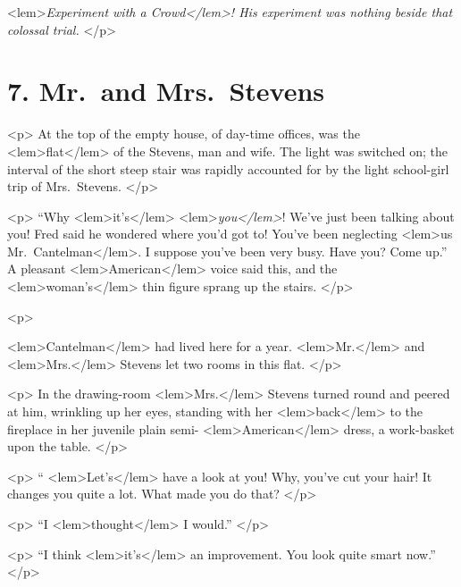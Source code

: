 {{<lem>\emph{Experiment with a Crowd</lem>! His experiment was nothing beside that colossal trial.}
					{} 
				</p> 

\newpage %

	\section*{7. Mr.\ and Mrs.\ Stevens} 

				<p>
				At the top of the empty house, of day-time offices, was the 
<lem>flat</lem>
					{} 
				of the Stevens, man 
				and wife. The light was switched on; the interval of the short steep stair was rapidly 
				accounted for by the light school-girl trip of Mrs.\ Stevens. 
 				</p> 

				<p>
				“Why 
<lem>it's</lem>{} 
<lem>\emph{you</lem>}{}! 
				We've just been talking about you! Fred said he wondered where you'd got 
				to! You've been neglecting 
<lem>us Mr.\ Cantelman</lem>{}. 
				I suppose you've been very busy. Have you? Come up.” 
				A pleasant 
<lem>American</lem>{} voice said this, and the 
<lem>woman's</lem>
					{} 
				thin figure sprang up the stairs. 
 				</p> 

				<p>
				
<lem>Cantelman</lem>{} had lived here for a year. 
<lem>Mr.</lem>
					{} 
				and 
<lem>Mrs.</lem>
					{} 
				Stevens let two rooms in this flat. 
 				</p> 

				<p>
				In the drawing-room 
<lem>Mrs.</lem>
					{} 
				Stevens turned round and peered at him, wrinkling up her eyes, 
				standing with her 
<lem>back</lem>
					{} 
				to the fireplace in her juvenile plain semi-
<lem>American</lem>{} dress, a work-basket upon the table. 
 				</p> 

				<p>
				“
<lem>Let's</lem>{} have a look at you! Why, you've cut your hair! It changes you quite a lot. What 
				made you do that? 
 				</p> 

				<p>
				“I 
<lem>thought</lem>
					{} 
				I would.” 
 				</p> 

				<p>
				“I think 
<lem>it's</lem>{} an improvement. You look quite smart now.” 
 				</p> 

}}
